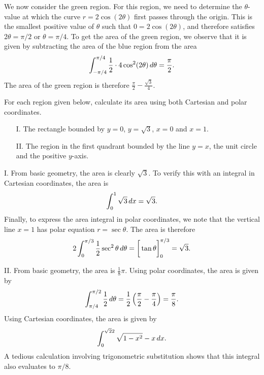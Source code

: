 \documentclass[]{ximera}
\begin{document}
\begin{problem}
\begin{solution}
We now consider the green region. For this region, we need to determine the $\theta$-value at which the curve $r=2\cos (2\theta)$ first passes through the origin. This is the smallest positive value of $\theta$ such that $0 = 2 \cos (2\theta)$, and therefore satisfies $2 \theta = \pi/2$ or $\theta = \pi/4$. To get the area of the green region, we observe that it is given by subtracting the area of the blue region from the area
$$
\int_{-\pi/4}^{\pi/4} \frac{1}{2} \cdot 4 \cos^2 (2 \theta) \mathop{}\!d \theta = \frac{\pi}{2}.
$$
The area of the green region is therefore $\frac{\pi}{2} - \frac{\sqrt{3}}{4}$. 
\end{solution}
\end{problem}

\begin{problem}
For each region given below, calculate its area using both Cartesian and polar coordinates.

\begin{itemize}
\item[I.] The rectangle bounded by $y=0$, $y=\sqrt{3}$, $x=0$ and $x=1$.

\item[II.] The region in the first quadrant bounded by the line $y=x$, the unit circle and the positive $y$-axis.
\end{itemize}

\begin{solution}
I. From basic geometry, the area is clearly $\sqrt{3}$. To verify this with an integral in Cartesian coordinates, the area is 
$$
\int_0^1 \sqrt{3} \mathop{}\!d x = \sqrt{3}.
$$
Finally, to  express the area integral in polar coordinates, we note that the vertical line $x = 1$ has polar equation $r = \sec \theta$. The area is therefore
$$
2 \int_0^{\pi/3} \frac{1}{2} \sec^2 \theta \mathop{}\!d \theta = \bigg[ \tan \theta \bigg]_0^{\pi/3} = \sqrt{3}.
$$ 

II. From basic geometry, the area is $\frac{1}{8} \pi$. Using polar coordinates, the area is given by
$$
\int_{\pi/4}^{\pi/2} \frac{1}{2} \mathop{}\!d \theta = \frac{1}{2}\left(\frac{\pi}{2} - \frac{\pi}{4}\right) = \frac{\pi}{8}.
$$
Using Cartesian coordinates, the area is given by
$$
\int_0^{\sqrt{2}{2}} \sqrt{1- x^2}-x \mathop{}\!d x.
$$
A tedious calculation involving trigonometric substitution shows that this integral also evaluates to $\pi/8$. 
\end{solution}
\end{problem}
\end{document}

